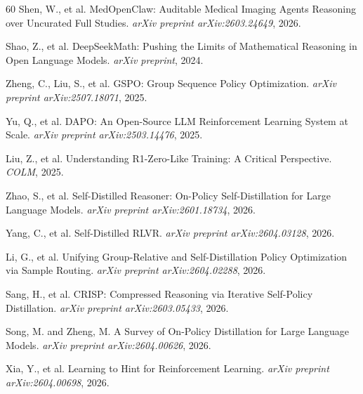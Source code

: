 \documentclass{article}
\begin{document}
\begin{thebibliography}{60}
Shen, W., et al.
\newblock MedOpenClaw: Auditable Medical Imaging Agents Reasoning over Uncurated Full Studies.
\newblock \emph{arXiv preprint arXiv:2603.24649}, 2026.


Shao, Z., et al.
\newblock DeepSeekMath: Pushing the Limits of Mathematical Reasoning in Open Language Models.
\newblock \emph{arXiv preprint}, 2024.

Zheng, C., Liu, S., et al.
\newblock GSPO: Group Sequence Policy Optimization.
\newblock \emph{arXiv preprint arXiv:2507.18071}, 2025.

Yu, Q., et al.
\newblock DAPO: An Open-Source LLM Reinforcement Learning System at Scale.
\newblock \emph{arXiv preprint arXiv:2503.14476}, 2025.

Liu, Z., et al.
\newblock Understanding R1-Zero-Like Training: A Critical Perspective.
\newblock \emph{COLM}, 2025.


Zhao, S., et al.
\newblock Self-Distilled Reasoner: On-Policy Self-Distillation for Large Language Models.
\newblock \emph{arXiv preprint arXiv:2601.18734}, 2026.

Yang, C., et al.
\newblock Self-Distilled RLVR.
\newblock \emph{arXiv preprint arXiv:2604.03128}, 2026.

Li, G., et al.
\newblock Unifying Group-Relative and Self-Distillation Policy Optimization via Sample Routing.
\newblock \emph{arXiv preprint arXiv:2604.02288}, 2026.

Sang, H., et al.
\newblock CRISP: Compressed Reasoning via Iterative Self-Policy Distillation.
\newblock \emph{arXiv preprint arXiv:2603.05433}, 2026.

Song, M. and Zheng, M.
\newblock A Survey of On-Policy Distillation for Large Language Models.
\newblock \emph{arXiv preprint arXiv:2604.00626}, 2026.


Xia, Y., et al.
\newblock Learning to Hint for Reinforcement Learning.
\newblock \emph{arXiv preprint arXiv:2604.00698}, 2026.


\end{thebibliography}
\end{document}
